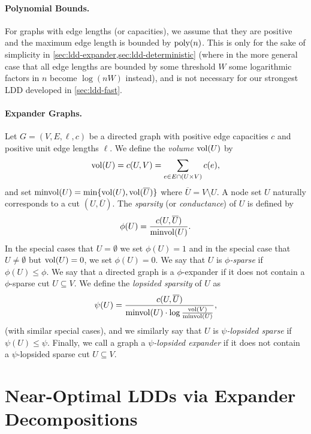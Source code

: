 \documentclass[letterpaper,11pt]{article}
\begin{document}
\paragraph{Polynomial Bounds.}
For graphs with edge lengths (or capacities), we assume that they are positive and the maximum edge length is bounded by $\operatorname{\text{{\rm poly}}}(n)$. This is only for the sake of simplicity in \cref{sec:ldd-expander,sec:ldd-deterministic} (where in the more general case that all edge lengths are bounded by some threshold $W$ some logarithmic factors in $n$ become $\log (nW)$ instead), and is not necessary for our strongest LDD developed in \cref{sec:ldd-fast}.

\paragraph{Expander Graphs.}
Let $G = (V, E, \ell, c)$ be a directed graph with positive edge capacities $c$ and positive unit edge lengths $\ell$. We define the \emph{volume $\operatorname{vol}(U)$} by
\begin{equation*}
	\operatorname{vol}(U) = c(U, V) = \sum_{e \in E \cap (U \times V)} c(e),
\end{equation*}
and set $\operatorname{minvol}(U) = \min\lbrace\operatorname{vol}(U), \operatorname{vol}(\overline U)\rbrace$ where $\overline U = V \setminus U$. A node set $U$ naturally corresponds to a cut $(U, \overline U)$. The \emph{sparsity} (or \emph{conductance}) of $U$ is defined by
\begin{equation*}
	\phi(U) = \frac{c(U, \overline U)}{\operatorname{minvol}(U)}.
\end{equation*}
In the special cases that $U = \emptyset$ we set $\phi(U) = 1$ and in the special case that $U \neq \emptyset$ but $\operatorname{vol}(U) = 0$, we set $\phi(U) = 0$.
We say that $U$ is \emph{$\phi$-sparse} if $\phi(U) \leq \phi$. We say that a directed graph is a $\phi$-expander if it does not contain a $\phi$-sparse cut $U \subseteq V$. 
We define the \emph{lopsided sparsity} of $U$ as
\begin{equation*}
	\psi(U) = \frac{c(U, \overline U)}{\operatorname{minvol}(U) \cdot \log \frac{\operatorname{vol}(V)}{\operatorname{minvol}(U)}},
\end{equation*}
(with similar special cases), and we similarly say that $U$ is \emph{$\psi$-lopsided sparse} if $\psi(U) \leq \psi$. Finally, we call a graph a \emph{$\psi$-lopsided expander} if it does not contain a $\psi$-lopsided sparse cut $U \subseteq V$.
 \section{Near-Optimal LDDs via Expander Decompositions} \label{sec:ldd-expander}
\end{document}

